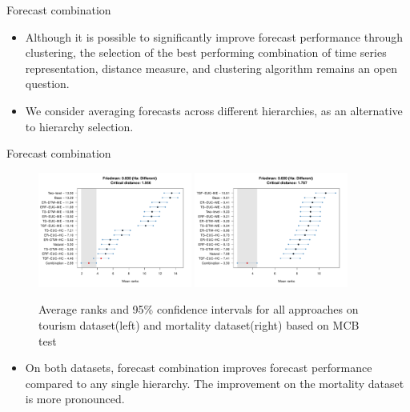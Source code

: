 \documentclass[aspectratio=169]{beamer}
\begin{document}
\begin{frame}{Forecast combination}
	\begin{itemize}
		\item Although it is possible to significantly improve forecast performance through clustering, the {\color{red} selection of the best performing combination} of time series representation, distance measure, and clustering algorithm remains an open question.
		\item We consider {\color{red} averaging forecasts across different hierarchies}, as an alternative to hierarchy selection.
	\end{itemize}
\end{frame}

\begin{frame}{Forecast combination}
	\begin{figure}
	\centering
	\includegraphics[width=0.45\textwidth]{../manuscript/figures/hierarchy_rmsse/tourism/P4_benchmarks_h12.pdf}
	\includegraphics[width=0.45\textwidth]{../manuscript/figures/hierarchy_rmsse/mortality/P4_benchmarks_h12.pdf}
	\caption{Average ranks and 95\% confidence intervals for all approaches on tourism dataset(left) and mortality dataset(right) based on MCB test}
	\end{figure}
	\begin{itemize}
		\item On both datasets, forecast combination improves forecast performance compared to any single hierarchy. The improvement on the mortality dataset is more pronounced.
	\end{itemize}
\end{frame}
\end{document}
